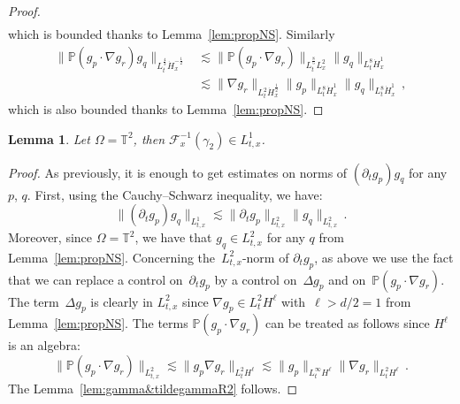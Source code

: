 \documentclass[11pt]{article}
\newtheorem{lemm}[theo]{Lemma}
\theoremstyle{definition}
\numberwithin{equation}{section}
\numberwithin{figure}{section}
\numberwithin{table}{section}
\newcommand*\T {\mathbb{T}}
\begin{document}
\begin{proof}
\begin{align*}
\end{align*}
which is bounded thanks to Lemma~\ref{lem:propNS}. Similarly
\begin{align*}
\|{\mathbb P}(g_p \cdot\nabla g_r)g_q\|_{L^\frac43_{t} \dot H^{-\frac12}_{x} } & \lesssim \| {\mathbb P}(g_p \cdot\nabla g_r)\|_{L^\frac85_{t} L^2_{x}} \| g_q\|_{L^8 _{t} \dot H^{ 1}_{x} }\\
& \lesssim \| \nabla g_r\|_{L^2_{t} \dot H^{ \frac12}_{x}} \| g_p \|_{L^8 _{t} \dot H^{ 1}_{x} } \| g_q \|_{L^8 _{t} \dot H^{ 1}_{x} }\,,
\end{align*}
which is also bounded thanks to Lemma~\ref{lem:propNS}.
\end{proof}

\begin{lemm}\label{lem:gamma&tildegammaT2}
Let $\Omega = \T^2$, then {$\mathcal{F}_x^{-1}(\gamma_2) \in L^1_{t,x}$}.
\end{lemm}
\begin{proof}
As previously, it is enough to get estimates on norms of $(\partial_t g_p)g_q$ for any~$p$, $q$. First, using the Cauchy--Schwarz inequality, we have:
\[
\|(\partial_t g_{p}) g_{q} \|_{L^1_{t,x}} \lesssim \|\partial_t g_{p} \|_{L^2_{t,x}} \| g_{q} \|_{L^2_{t,x}} \,.
\]
Moreover, since $\Omega = \T^2$, we have that $g_q \in L^2_{t,x}$ for any $q$ from Lemma~\ref{lem:propNS}. Concerning the~$L^2_{t,x}$-norm of $\partial_t g_{p} $, as above we use the fact that we can replace a control on~$\partial_t g_{p}$ by a control on~$\Delta g_p$ and on~${\mathbb P}(g_p \cdot\nabla g_r)$. The term~$\Delta g_{p} $ is clearly in $L^2_{t,x}$ since $\nabla g_{p} \in L^2_t H^{\ell}$ with~$\ell>d/2=1$ from Lemma~\ref{lem:propNS}. The terms ${\mathbb P}(g_p \cdot\nabla g_r)$ can be treated as follows since $H^\ell$ is an algebra:
\[
\|{\mathbb P}(g_p \cdot\nabla g_r)\|_{L^2_{t,x}} \lesssim \|g_p \nabla g_r\|_{L^2_{t} H^\ell}
\lesssim \|g_p\|_{L^\infty_t H^\ell} \|\nabla g_r\|_{L^2_t H^\ell } \,.
\]
The Lemma~\ref{lem:gamma&tildegammaR2} follows.
\end{proof}
\goodbreak
\end{document}
